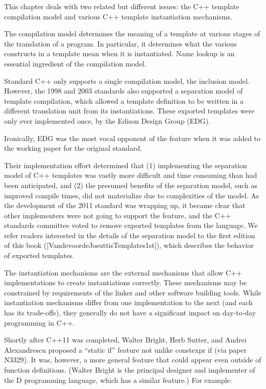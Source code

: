 This chapter deals with two related but different issues: the C++ template compilation model and various C++ template instantiation mechanisms.

The compilation model determines the meaning of a template at various stages of the translation of a program. In particular, it determines what the various constructs in a template mean when it is instantiated. Name lookup is an essential ingredient of the compilation model.

Standard C++ only supports a single compilation model, the inclusion model. However, the 1998 and 2003 standards also supported a separation model of template compilation, which allowed a template definition to be written in a different translation unit from its instantiations. These exported templates were only ever implemented once, by the Edison Design Group (EDG).

\begin{tcolorbox}[colback=webgreen!5!white,colframe=webgreen!75!black]
\hspace*{0.75cm}Ironically, EDG was the most vocal opponent of the feature when it was added to the working paper for the original standard.
\end{tcolorbox}

Their implementation effort determined that (1) implementing the separation model of C++ templates was vastly more difficult and time consuming than had been anticipated, and (2) the presumed benefits of the separation model, such as improved compile times, did not materialize due to complexities of the model. As the development of the 2011 standard was wrapping up, it became clear that other implementers were not going to support the feature, and the C++ standards committee voted to remove exported templates from the language. We refer readers interested in the details of the separation model to the first edition of this book ([VandevoordeJosuttisTemplates1st]), which describes the behavior of exported templates. 

The instantiation mechanisms are the external mechanisms that allow C++ implementations to create instantiations correctly. These mechanisms may be constrained by requirements of the linker and other software building tools. While instantiation mechanisms differ from one implementation to the next (and each has its trade-offs), they generally do not have a significant impact on day-to-day programming in C++.

Shortly after C++11 was completed, Walter Bright, Herb Sutter, and Andrei Alexandrescu proposed a “static if” feature not unlike constexpr if (via paper N3329). It was, however, a more general feature that could appear even outside of function definitions. (Walter Bright is the principal designer and implementer of the D programming language, which has a similar feature.) For example:

